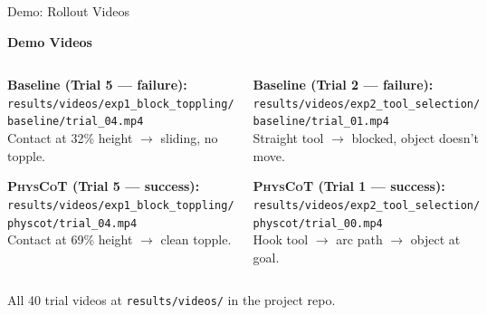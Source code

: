 \documentclass[aspectratio=169,10pt]{beamer}
\newcommand{\physcot}{\textsc{PhysCoT}}
\begin{document}
\begin{frame}{Demo: Rollout Videos}
\begin{center}
\Large\textbf{Demo Videos}
\end{center}

\vspace{0.3cm}
\begin{columns}[T]
\begin{tcolorbox}[colback=basered!10,colframe=basered,
                  title={\small Experiment 1: Block Toppling},
                  left=4pt,right=4pt,top=3pt,bottom=3pt]
\small
\textbf{Baseline (Trial 5 — failure):}\\
\texttt{results/videos/exp1\_block\_toppling/}\\
\texttt{baseline/trial\_04.mp4}\\[4pt]
Contact at 32\% height $\to$ sliding, no topple.

\vspace{6pt}
\textbf{\physcot{} (Trial 5 — success):}\\
\texttt{results/videos/exp1\_block\_toppling/}\\
\texttt{physcot/trial\_04.mp4}\\[4pt]
Contact at 69\% height $\to$ clean topple.
\end{tcolorbox}

\begin{tcolorbox}[colback=physgreen!10,colframe=physgreen,
                  title={\small Experiment 2: Tool Selection},
                  left=4pt,right=4pt,top=3pt,bottom=3pt]
\small
\textbf{Baseline (Trial 2 — failure):}\\
\texttt{results/videos/exp2\_tool\_selection/}\\
\texttt{baseline/trial\_01.mp4}\\[4pt]
Straight tool $\to$ blocked, object doesn't move.

\vspace{6pt}
\textbf{\physcot{} (Trial 1 — success):}\\
\texttt{results/videos/exp2\_tool\_selection/}\\
\texttt{physcot/trial\_00.mp4}\\[4pt]
Hook tool $\to$ arc path $\to$ object at goal.
\end{tcolorbox}
\end{columns}

\vspace{0.3cm}
\begin{center}
\small All 40 trial videos at \texttt{results/videos/} in the project repo.
\end{center}
\end{frame}
\end{document}
